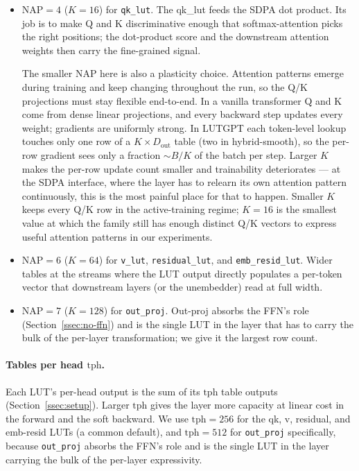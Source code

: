 \documentclass[11pt]{article}
\newcommand{\dout}{D_{\mathrm{out}}}
\begin{document}
\begin{itemize}[leftmargin=*,topsep=2pt,itemsep=1pt]
\item $\mathrm{NAP} = 4$ ($K = 16$) for \texttt{qk\_lut}. The qk\_lut feeds the SDPA dot product. Its job is to make Q and K discriminative enough that softmax-attention picks the right positions; the dot-product score and the downstream attention weights then carry the fine-grained signal.

The smaller NAP here is also a plasticity choice. Attention patterns emerge during training and keep changing throughout the run, so the Q/K projections must stay flexible end-to-end. In a vanilla transformer Q and K come from dense linear projections, and every backward step updates every weight; gradients are uniformly strong. In LUTGPT each token-level lookup touches only one row of a $K \times \dout$ table (two in hybrid-smooth), so the per-row gradient sees only a fraction $\sim B / K$ of the batch per step. Larger $K$ makes the per-row update count smaller and trainability deteriorates --- at the SDPA interface, where the layer has to relearn its own attention pattern continuously, this is the most painful place for that to happen. Smaller $K$ keeps every Q/K row in the active-training regime; $K = 16$ is the smallest value at which the family still has enough distinct Q/K vectors to express useful attention patterns in our experiments.
\item $\mathrm{NAP} = 6$ ($K = 64$) for \texttt{v\_lut}, \texttt{residual\_lut}, and \texttt{emb\_resid\_lut}. Wider tables at the streams where the LUT output directly populates a per-token vector that downstream layers (or the unembedder) read at full width.
\item $\mathrm{NAP} = 7$ ($K = 128$) for \texttt{out\_proj}. Out-proj absorbs the FFN's role (Section~\ref{ssec:no-ffn}) and is the single LUT in the layer that has to carry the bulk of the per-layer transformation; we give it the largest row count.
\end{itemize}

\paragraph{Tables per head $\mathrm{tph}$.} Each LUT's per-head output is the sum of its $\mathrm{tph}$ table outputs (Section~\ref{ssec:setup}). Larger $\mathrm{tph}$ gives the layer more capacity at linear cost in the forward and the soft backward. We use $\mathrm{tph} = 256$ for the qk, v, residual, and emb-resid LUTs (a common default), and $\mathrm{tph} = 512$ for \texttt{out\_proj} specifically, because \texttt{out\_proj} absorbs the FFN's role and is the single LUT in the layer carrying the bulk of the per-layer expressivity.
\end{document}
